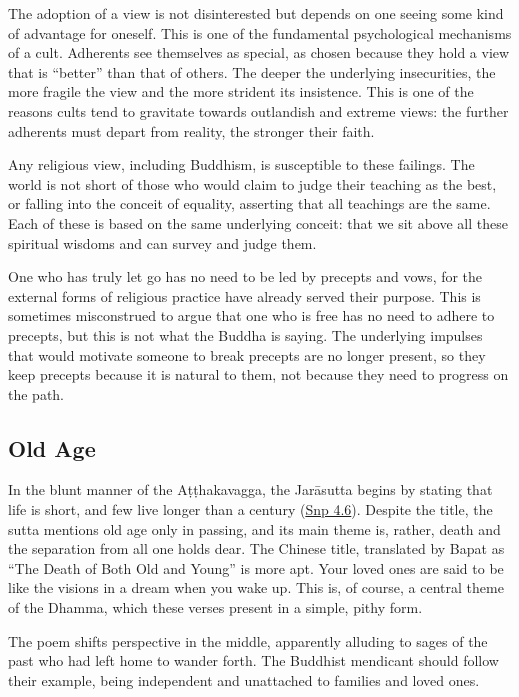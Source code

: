 \documentclass[12pt,openany]{book}%
\begin{document}
The adoption of a view is not disinterested but depends on one seeing some kind of advantage for oneself. This is one of the fundamental psychological mechanisms of a cult. Adherents see themselves as special, as chosen because they hold a view that is “better” than that of others. The deeper the underlying insecurities, the more fragile the view and the more strident its insistence. This is one of the reasons cults tend to gravitate towards outlandish and extreme views: the further adherents must depart from reality, the stronger their faith.

Any religious view, including Buddhism, is susceptible to these failings. The world is not short of those who would claim to judge their teaching as the best, or falling into the conceit of equality, asserting that all teachings are the same. Each of these is based on the same underlying conceit: that we sit above all these spiritual wisdoms and can survey and judge them.

One who has truly let go has no need to be led by precepts and vows, for the external forms of religious practice have already served their purpose. This is sometimes misconstrued to argue that one who is free has no need to adhere to precepts, but this is not what the Buddha is saying. The underlying impulses that would motivate someone to break precepts are no longer present, so they keep precepts because it is natural to them, not because they need to progress on the path.

\subsection*{Old Age}

In the blunt manner of the \textsanskrit{Aṭṭhakavagga}, the \textsanskrit{Jarāsutta} begins by stating that life is short, and few live longer than a century (\href{https://suttacentral.net/snp4.6/en/sujato}{Snp 4.6}). Despite the title, the sutta mentions old age only in passing, and its main theme is, rather, death and the separation from all one holds dear. The Chinese title, translated by Bapat as “The Death of Both Old and Young” is more apt. Your loved ones are said to be like the visions in a dream when you wake up. This is, of course, a central theme of the Dhamma, which these verses present in a simple, pithy form.

The poem shifts perspective in the middle, apparently alluding to sages of the past who had left home to wander forth. The Buddhist mendicant should follow their example, being independent and unattached to families and loved ones.
\end{document}
